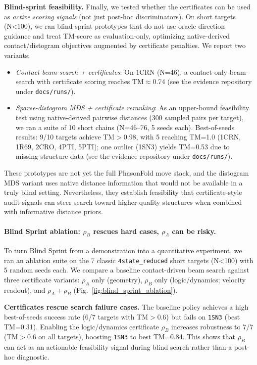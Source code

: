 \textbf{Blind-sprint feasibility.} Finally, we tested whether the certificates can be used as \emph{active scoring signals} (not just post-hoc discriminators). On short targets (N<100), we ran blind-sprint prototypes that do not use oracle direction guidance and treat TM-score as evaluation-only, optimizing native-derived contact/distogram objectives augmented by certificate penalties. We report two variants:
\begin{itemize}[nosep,leftmargin=*]
  \item \emph{Contact beam-search + certificates}: On 1CRN (N=46), a contact-only beam-search with certificate scoring reaches TM$\approx$0.74 (see the evidence repository under \texttt{docs/runs/}).
  \item \emph{Sparse-distogram MDS + certificate reranking}: As an upper-bound feasibility test using native-derived pairwise distances (300 sampled pairs per target), we ran a suite of 10 short chains (N=46--76, 5 seeds each). Best-of-seeds results: 9/10 targets achieve TM$>$0.98, with 5 reaching TM=1.0 (1CRN, 1R69, 2CRO, 4PTI, 5PTI); one outlier (1SN3) yields TM=0.53 due to missing structure data (see the evidence repository under \texttt{docs/runs/}).
\end{itemize}
These prototypes are not yet the full PhasonFold move stack, and the distogram MDS variant uses native distance information that would not be available in a truly blind setting. Nevertheless, they establish feasibility that certificate-style audit signals can steer search toward higher-quality structures when combined with informative distance priors.

\paragraph{Blind Sprint ablation: $\rho_B$ rescues hard cases, $\rho_A$ can be risky.}
To turn Blind Sprint from a demonstration into a quantitative experiment, we ran an ablation suite on the 7 classic \texttt{4state\_reduced} short targets (N<100) with 5 random seeds each. We compare a baseline contact-driven beam search against three certificate variants: $\rho_A$ only (geometry), $\rho_B$ only (logic/dynamics; velocity readout), and $\rho_A+\rho_B$ (Fig.~\ref{fig:blind_sprint_ablation}).

\textbf{Certificates rescue search failure cases.}
The baseline policy achieves a high best-of-seeds success rate (6/7 targets with TM$>$0.6) but fails on \texttt{1SN3} (best TM=0.31). Enabling the logic/dynamics certificate $\rho_B$ increases robustness to 7/7 (TM$>$0.6 on all targets), boosting \texttt{1SN3} to best TM=0.84. This shows that $\rho_B$ can act as an actionable feasibility signal during blind search rather than a post-hoc diagnostic.

